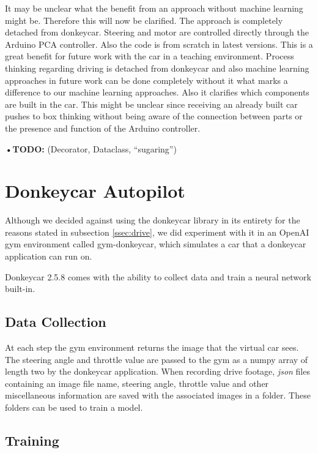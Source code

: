 \documentclass[conference]{IEEEtran}
\begin{document}
It may be unclear what the benefit from an approach without machine learning might be.
Therefore this will now be clarified.
The approach is completely detached from donkeycar.
Steering and motor are controlled directly through the Arduino PCA controller.
Also the code is from scratch in latest versions.
This is a great benefit for future work with the car in a teaching environment.
Process thinking regarding driving is detached from donkeycar and also machine learning approaches in future work can be done completely without it what marks a difference to our machine learning approaches.
Also it clarifies which components are built in the car.
This might be unclear since receiving an already built car pushes to box thinking without being aware of the connection between parts or the presence and function of the Arduino controller.

\textbf{•TODO:} (Decorator, Dataclass, "`sugaring"')

\section{Donkeycar Autopilot}

Although we decided against using the donkeycar library in its entirety for the reasons stated in subsection \ref{ssec:drive}, we did experiment with it in an OpenAI gym environment called gym-donkeycar, which simulates a car that a donkeycar application can run on.

Donkeycar 2.5.8 comes with the ability to collect data and train a neural network built-in.

\subsection{Data Collection}

At each step the gym environment returns the image that the virtual car sees. 
The steering angle and throttle value are passed to the gym as a numpy array of length two by the donkeycar application. 
When recording drive footage, \textit{json} files containing an image file name, steering angle, throttle value and other miscellaneous information are saved with the associated images in a folder. 
These folders can be used to train a model.

\subsection{Training}
\end{document}
